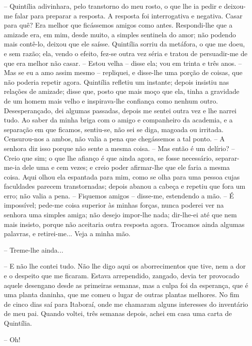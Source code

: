 -- Quintília adivinhara, pelo transtorno do meu rosto, o que lhe ia
pedir e deixou-me falar para preparar a resposta. A resposta foi
interrogativa e negativa. Casar para quê? Era melhor que ficássemos
amigos como antes. Respondi-lhe que a amizade era, em mim, desde muito,
a simples sentinela do amor; não podendo mais contê-lo, deixou que ele
saísse. Quintília sorriu da metáfora, o que me doeu, e sem razão; ela,
vendo o efeito, fez-se outra vez séria e tratou de persuadir-me de que
era melhor não casar. -- Estou velha -- disse ela; vou em trinta e três
anos. -- Mas se eu a amo assim mesmo -- repliquei, e disse-lhe uma
porção de coisas, que não poderia repetir agora. Quintília refletiu um
instante; depois insistiu nas relações de amizade; disse que, posto que
mais moço que ela, tinha a gravidade de um homem mais velho e
inspirava-lhe confiança como nenhum outro. Desesperançado, dei algumas
passadas, depois me sentei outra vez e lhe narrei tudo. Ao saber da
minha briga com o amigo e companheiro da academia, e a separação em que
ficamos, sentiu-se, não sei se diga, magoada ou irritada. Censurou-nos a
ambos, não valia a pena que chegássemos a tal ponto. -- A senhora diz
isso porque não sente a mesma coisa. -- Mas então é um delírio? -- Creio
que sim; o que lhe afianço é que ainda agora, se fosse necessário,
separar-me-ia dele uma e cem vezes; e creio poder afirmar-lhe que ele
faria a mesma coisa. Aqui olhou ela espantada para mim, como se olha
para uma pessoa cujas faculdades parecem transtornadas; depois abanou a
cabeça e repetiu que fora um erro; não valia a pena. -- Fiquemos amigos
-- disse-me, estendendo a mão. -- É impossível; pede-me coisa superior
às minhas forças, nunca poderei ver na senhora uma simples amiga; não
desejo impor-lhe nada; dir-lhe-ei até que nem mais insisto, porque não
aceitaria outra resposta agora. Trocamos ainda algumas palavras, e
retirei-me... Veja a minha mão.

-- Treme-lhe ainda...

-- E não lhe contei tudo. Não lhe digo aqui os aborrecimentos que tive,
nem a dor e o despeito que me ficaram. Estava arrependido, zangado,
devia ter provocado aquele desengano desde as primeiras semanas, mas a
culpa foi da esperança, que é uma planta daninha, que me comeu o lugar
de outras plantas melhores. No fim de cinco dias saí para Itaboraí, onde
me chamaram alguns interesses do inventário de meu pai. Quando voltei,
três semanas depois, achei em casa uma carta de Quintília.

-- Oh!

